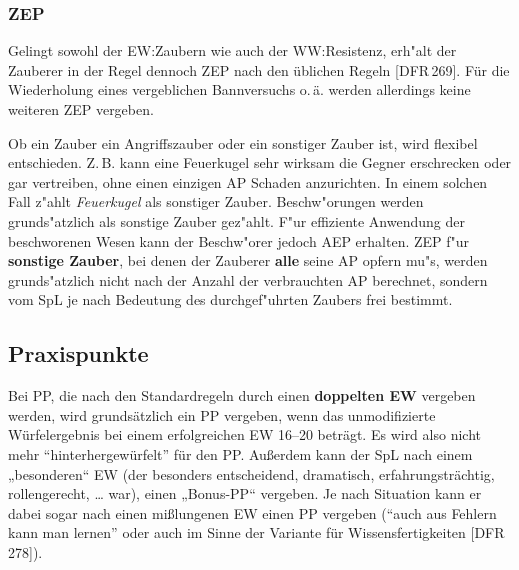 \documentclass[10pt,a4paper,germanpar]{article}
\begin{document}
\subsubsection{ZEP} 

Gelingt sowohl der EW:Zaubern wie auch der WW:Resistenz, erh"alt der
Zauberer in der Regel dennoch ZEP nach den üblichen Regeln [DFR\,269].
Für die Wiederholung eines vergeblichen Bannversuchs o.\,ä. werden
allerdings keine weiteren ZEP vergeben.

Ob ein Zauber ein Angriffszauber oder ein sonstiger Zauber ist, wird
flexibel entschieden. Z.\,B. kann eine Feuerkugel sehr wirksam die
Gegner erschrecken oder gar vertreiben, ohne einen einzigen AP Schaden
anzurichten. In einem solchen Fall z"ahlt \emph{Feuerkugel} als
sonstiger Zauber. Beschw"orungen werden grunds"atzlich als sonstige
Zauber gez"ahlt. F"ur effiziente Anwendung der beschworenen Wesen kann
der Beschw"orer jedoch AEP erhalten. ZEP f"ur \textbf{sonstige
  Zauber}, bei denen der Zauberer \textbf{alle} seine AP opfern mu"s,
werden grunds"atzlich nicht nach der Anzahl der verbrauchten AP
berechnet, sondern vom SpL je nach Bedeutung des durchgef"uhrten
Zaubers frei bestimmt.

\subsection{Praxispunkte}

Bei PP, die nach den Standardregeln durch einen \textbf{doppelten EW}
vergeben werden, wird grundsätzlich ein PP vergeben, wenn das
unmodifizierte Würfelergebnis bei einem erfolgreichen EW 16--20
beträgt. Es wird also nicht mehr "`hinterhergewürfelt"' für den
PP. Außerdem kann der SpL nach einem „besonderen“ EW (der besonders
entscheidend, dramatisch, erfahrungsträchtig, rollengerecht, \dots
war), einen „Bonus-PP“ vergeben. Je nach Situation kann er dabei sogar
nach einen mißlungenen EW einen PP vergeben ("`auch aus Fehlern kann
man lernen"' oder auch im Sinne der Variante für Wissensfertigkeiten
[DFR\,278]).

% 
\end{document}

